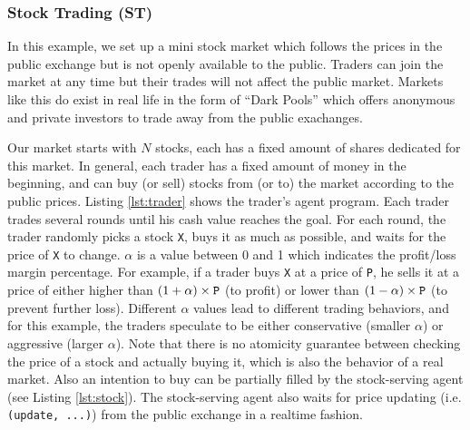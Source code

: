 \subsubsection*{Stock Trading (ST)}

In this example, we set up a mini stock market which follows the prices in the public exchange 
but is not openly available to the public. 
Traders can join the market at any time but their trades will not affect the public market.
Markets like this do exist in real life in the form of 
``Dark Pools''\cite{degryse2008shedding}  
which offers anonymous and private investors to
trade away from the public exachanges.

Our market starts with $N$ stocks, each has a fixed amount of shares dedicated for this market.
In general, each trader has a fixed amount of money in the beginning, 
and can buy (or sell) stocks from (or to) the market according to the public prices.
Listing \ref{lst:trader} shows the trader's agent program. 
Each trader trades several rounds until his cash value reaches the goal. 
For each round, the trader randomly picks a stock {\tt X}, buys it as much as possible, 
and waits for the price of {\tt X} to change. 
$\alpha$ is a value between 0 and 1 which indicates the profit/loss margin percentage. 
For example, if a trader buys {\tt X} at a price of {\tt P}, 
he sells it at a price of either higher than $(1+\alpha)\times{\tt P}$ (to profit)
or lower than $(1-\alpha)\times{\tt P}$ (to prevent further loss). 
Different $\alpha$ values lead to different trading behaviors, and for this example,
the traders speculate to be either 
conservative (smaller $\alpha$) or aggressive (larger $\alpha$).
Note that there is no atomicity guarantee between checking the price of a stock 
and actually buying it, which is also the behavior of a real market.
Also an intention to buy can be partially filled by the stock-serving agent
(see Listing \ref{lst:stock}).
The stock-serving agent also waits for price updating (i.e. {\tt (update, ...)})
from the public exchange in a realtime fashion. 

